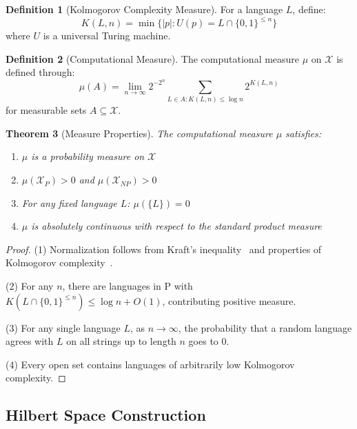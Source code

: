 \documentclass[12pt]{article}
\theoremstyle{plain}
\newtheorem{theorem}{Theorem}[section]
\theoremstyle{definition}
\newtheorem{definition}[theorem]{Definition}
\begin{document}
\begin{definition}[Kolmogorov Complexity Measure]
For a language $L$, define:
\begin{equation}
K(L, n) = \min\{|p| : U(p) = L \cap \{0,1\}^{\leq n}\}
\end{equation}
where $U$ is a universal Turing machine.
\end{definition}

\begin{definition}[Computational Measure]
The computational measure $\mu$ on $\mathcal{X}$ is defined through:
\begin{equation}
\mu(A) = \lim_{n \to \infty} 2^{-2^n} \sum_{L \in A: K(L,n) \leq \log n} 2^{K(L,n)}
\end{equation}
for measurable sets $A \subseteq \mathcal{X}$.
\end{definition}

\begin{theorem}[Measure Properties]
\label{thm:measure_props}
The computational measure $\mu$ satisfies:
\begin{enumerate}
\item $\mu$ is a probability measure on $\mathcal{X}$
\item $\mu(\mathcal{X}_P) > 0$ and $\mu(\mathcal{X}_{NP}) > 0$
\item For any fixed language $L$: $\mu(\{L\}) = 0$
\item $\mu$ is absolutely continuous with respect to the standard product measure
\end{enumerate}
\end{theorem}

\begin{proof}
(1) Normalization follows from Kraft's inequality~\cite{kraft1949device} and properties of Kolmogorov complexity~\cite{li2008introduction}.

(2) For any $n$, there are languages in P with $K(L \cap \{0,1\}^{\leq n}) \leq \log n + O(1)$, contributing positive measure.

(3) For any single language $L$, as $n \to \infty$, the probability that a random language agrees with $L$ on all strings up to length $n$ goes to 0.

(4) Every open set contains languages of arbitrarily low Kolmogorov complexity.
\end{proof}

\subsection{Hilbert Space Construction}
\end{document}
